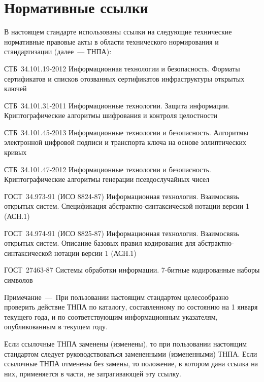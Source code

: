 \chapter{Нормативные ссылки}\label{REFS}

В настоящем стандарте использованы ссылки на следующие технические 
нормативные правовые акты в области технического нормирования и 
стандартизации (далее~--- ТНПА):  

СТБ~34.101.19-2012 Информационная технологии и безопасность. Форматы 
сертификатов и списков отозванных сертификатов инфраструктуры открытых 
ключей 

СТБ~34.101.31-2011 Информационные технологии. Защита информации. 
Криптографические алгоритмы шифрования и контроля целостности 

СТБ~34.101.45-2013 Информационные технологии и безопасность. Алгоритмы  
электронной цифровой подписи и транспорта ключа на основе эллиптических 
кривых 

СТБ~34.101.47-2012 Информационные технологии и безопасность. 
Криптографические алгоритмы генерации псевдослучайных чисел 

ГОСТ~34.973-91 (ИСО 8824-87) Информационная технология. Взаимосвязь 
открытых систем. Спецификация абстрактно-синтаксической нотации версии 1 
(АСН.1) 

ГОСТ~34.974-91 (ИСО 8825-87) Информационная технология. Взаимосвязь 
открытых систем. Описание базовых правил кодирования для 
абстрактно-синтаксической нотации версии 1 (АСН.1) 

ГОСТ~27463-87 Системы обработки информации. 7-битные кодированные наборы 
символов 

\begin{note}
Примечание~---~При пользовании настоящим стандартом целесообразно 
проверить действие ТНПА по каталогу, составленному по состоянию на 1 
января текущего года, и по соответствующим информационным указателям, 
опубликованным в текущем году. 

Если ссылочные ТНПА заменены (изменены), то 
при пользовании настоящим стандартом следует руководствоваться замененными 
(измененными) ТНПА. Если ссылочные ТНПА отменены без замены, то положение, 
в котором дана ссылка на них, применяется в части, не затрагивающей эту 
ссылку. 
\end{note}

